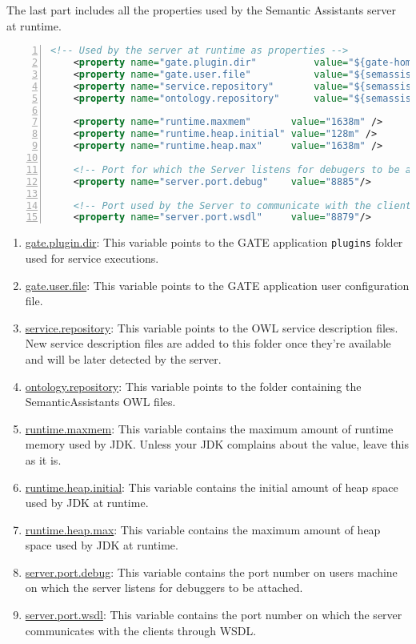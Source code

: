 The last part includes all the properties used by the Semantic Assistants server at runtime.
\begin{lstlisting}[language=XML,numbers=left,xleftmargin=8mm,columns=flexible]
    <!-- Used by the server at runtime as properties -->
    <property name="gate.plugin.dir"          value="${gate-home}/plugins/"/>
    <property name="gate.user.file"           value="${semassist.home}/Server/gate-home/user-gate.xml" />
    <property name="service.repository"       value="${semassist.home}/Resources/OwlServiceDescriptions/"/>
    <property name="ontology.repository"      value="${semassist.home}/Resources/ont-repository/" />

    <property name="runtime.maxmem"       value="1638m" />
    <property name="runtime.heap.initial" value="128m" />
    <property name="runtime.heap.max"     value="1638m" />
    
    <!-- Port for which the Server listens for debugers to be attached -->
    <property name="server.port.debug"    value="8885"/>
    
    <!-- Port used by the Server to communicate with the clients through wsdl-->
    <property name="server.port.wsdl"     value="8879"/>
\end{lstlisting}
\begin{enumerate}
\item \url{gate.plugin.dir}: This variable points to the GATE application \texttt{plugins} folder used for service executions.
\item \url{gate.user.file}: This variable points to the GATE application user configuration file.
\item \url{service.repository}: This variable points to the OWL service description files. New service description files are added to this folder once they're available and will be later detected by the server. 
\item \url{ontology.repository}: This variable points to the folder containing the SemanticAssistants OWL files.
\item \url{runtime.maxmem}: This variable contains the maximum amount of runtime memory used by JDK. Unless your JDK complains about the value, leave this as it is.
\item \url{runtime.heap.initial}: This variable contains the initial amount of heap space used by JDK at runtime.
\item \url{runtime.heap.max}: This variable contains the maximum amount of heap space used by JDK at runtime.
\item \url{server.port.debug}: This variable contains the port number on users machine on which the server listens for debuggers to be attached.
\item \url{server.port.wsdl}: This variable contains the port number on which the server communicates with the clients through WSDL.
\end{enumerate}

